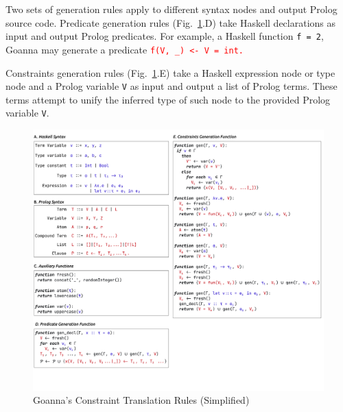     Two sets of generation rules apply to different syntax nodes and output Prolog source code. Predicate generation rules (Fig.~\ref{fig:translation}.D) take Haskell declarations as input and output Prolog predicates. For example, a Haskell function \texttt{f = 2}, Goanna may generate a predicate \texttt{\textcolor{red}{f(V, \_) <- V = int.}}
    
    Constraints generation rules (Fig.~\ref{fig:translation}.E) take a Haskell expression node or type node and a Prolog variable \texttt{V} as input and output a list of Prolog terms. These terms attempt to unify the inferred type of such node to the provided Prolog variable \texttt{V}.
    
    \begin{figure}[ht!]
        \centering
        \includegraphics[width=\linewidth]{images/Generation}
        \caption{Goanna's Constraint Translation Rules (Simplified)} 
        \label{fig:translation}
    \end{figure}
    


